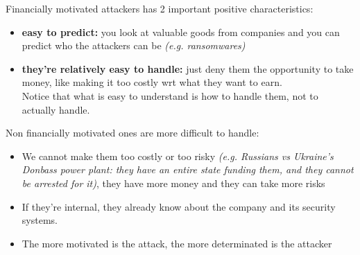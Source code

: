 \begin{description}
\begin{itemize}
                \end{itemize}
                    Financially motivated attackers has 2 important positive characteristics:
                    \begin{itemize}
                    \item \textbf{easy to predict:} you look at valuable goods from companies and you can predict who the attackers can be \textit{(e.g. ransomwares)}
                    \item \textbf{they're relatively easy to handle:} just deny them the opportunity to take money, like making it too costly wrt what they want to earn.\\
                            Notice that what is easy to understand is how to handle them, not to actually handle.
                    \end{itemize}
                    Non financially motivated ones are more difficult to handle:
                    \begin{itemize}
                        \item We cannot make them too costly or too risky \textit{(e.g. Russians vs Ukraine's Donbass power plant: they have an entire state funding them, and they cannot be arrested for it)}, they have more money and they can take more risks
                        \item If they're internal, they already know about the company and its security systems.
                        \item The more motivated is the attack, the more determinated is the attacker
                    \end{itemize}
        \end{description}
\newpage
